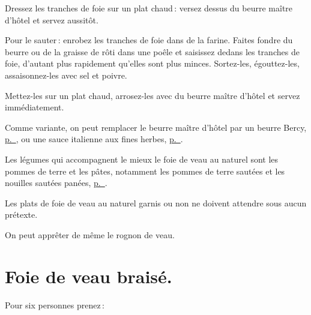 Dressez les tranches de foie sur un plat chaud : versez dessus du beurre maître
d'hôtel et servez aussitôt.

Pour le sauter : enrobez les tranches de foie dans de la farine. Faites fondre
du beurre ou de la graisse de rôti dans une poêle et saisissez dedans les
tranches de foie, d'autant plus rapidement qu'elles sont plus minces.
Sortez-les, égouttez-les, assaisonnez-les avec sel et poivre.

Mettez-les sur un plat chaud, arrosez-les avec du beurre maître d'hôtel et
servez immédiatement.

\sk

Comme variante, on peut remplacer le beurre maître d'hôtel par un beurre Bercy,
\hyperlink{p0453}{p. \pageref{pg0453}}, ou une sauce italienne aux fines herbes,
\hyperlink{p0490}{p. \pageref{pg0490}}.

\sk

Les légumes qui accompagnent le mieux le foie de veau au naturel sont les
pommes de terre et les pâtes, notamment les pommes de terre sautées et les
nouilles sautées panées, \hyperlink{p0681}{p. \pageref{pg0681}}.

\sk

Les plats de foie de veau au naturel garnis ou non ne doivent attendre sous
aucun prétexte.

\sk

On peut apprêter de même le rognon de veau.

\section*{\centering Foie de veau braisé.}
{}

Pour six personnes prenez :

\medskip

